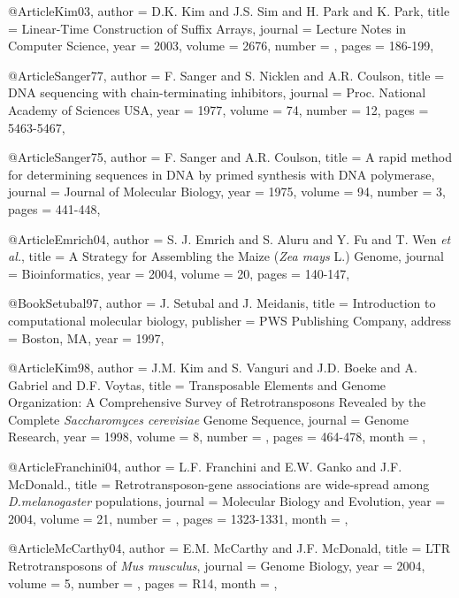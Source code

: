 @Article{Kim03,
  author =      {D.K. Kim and J.S. Sim and H. Park and K. Park},
  title =       {Linear-Time Construction of Suffix Arrays},
  journal =     {Lecture Notes in Computer Science},
  year =        {2003},
  volume =      {2676},
  number =      {},
  pages =       {186-199},
}

@Article{Sanger77,
  author = {F. Sanger and S. Nicklen and A.R. Coulson},
  title =  {{DNA sequencing with chain-terminating inhibitors}},
  journal = {Proc. National Academy of Sciences USA},
  year = {1977},
  volume =  {74},
  number =  {12},
  pages =   {5463-5467},
}

@Article{Sanger75,
  author = {F. Sanger and A.R. Coulson},
  title =  {{A rapid method for determining sequences in DNA by primed synthesis with DNA polymerase}},
  journal = {Journal of Molecular Biology},
  year = {1975},
  volume =  {94},
  number =  {3},
  pages =   {441-448},
}


@Article{Emrich04,
author = {S. J. Emrich and S. Aluru and Y. Fu and T. Wen {\it et al.}},
title = {A Strategy for Assembling the Maize (\emph{Zea mays} {L.}) Genome},
journal = {Bioinformatics},
year = {2004},
volume = {20},
pages = {140-147},
}



@Book{Setubal97,
  author = 	 {J. Setubal and J. Meidanis},
  title = 	 {Introduction to computational molecular biology},
  publisher =  {{PWS Publishing Company}},
  address =  {Boston, MA},
  year = 	 {1997},
}

@Article{Kim98,
  author = 	 {J.M. Kim and S. Vanguri and J.D. Boeke and A. Gabriel and D.F. Voytas},
  title = 	 {{Transposable Elements and Genome Organization: A Comprehensive Survey of Retrotransposons Revealed by the Complete {\it Saccharomyces cerevisiae} Genome Sequence}},
  journal =  {Genome Research},
  year = 	 {1998},
  volume = 	 {8},
  number = 	 {},
  pages = 	 {464-478},
  month = 	 {},
}

@Article{Franchini04,
  author = 	 { L.F. Franchini and E.W. Ganko and J.F. McDonald.},
  title = 	 {{Retrotransposon-gene associations are wide-spread among {\it D.melanogaster} populations}},
  journal =  {Molecular Biology and Evolution},
  year = 	 {2004},
  volume = 	 {21},
  number = 	 {},
  pages = 	 {1323-1331},
  month = 	 {},
}

@Article{McCarthy04,
  author = 	 {E.M. McCarthy and J.F. McDonald},
  title = 	 {{LTR Retrotransposons of {\it Mus musculus}}},
  journal =  {Genome Biology},
  year = 	 {2004},
  volume = 	 {5},
  number = 	 {},
  pages = 	 {R14},
  month = 	 {},
}

